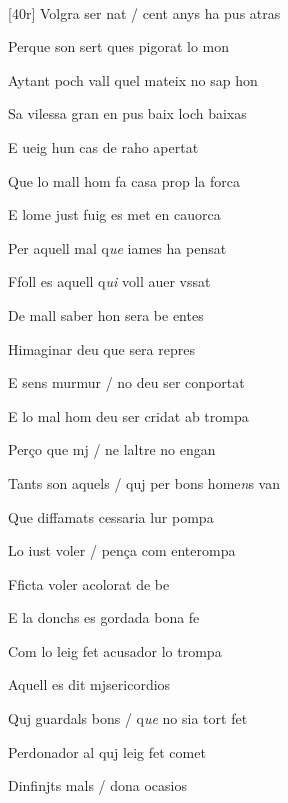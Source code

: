 \documentclass[12pt]{article}
\renewcommand{\espaiAbansEtiquetaPoema}{\vspace{0ex}}
\begin{document}
\begin{estrofa}

\espaiAbansEtiquetaPoema

\\

\end{estrofa}


\begin{estrofa}

 [40r] Volgra ser nat / cent anys ha pus atras

 Perque son sert ques pigorat lo mon

 Aytant poch vall quel mateix no sap hon

 Sa vilessa gran en pus baix loch baixas

 E ueig hun cas de raho apertat

 Que lo mall hom fa casa prop la forca

 E lome just fuig es met en cauorca

 Per aquell mal q\textit{ue} iames ha pensat

\end{estrofa}



\begin{estrofa}

 Ffoll es aquell q\textit{ui} voll auer vssat

 De mall saber hon sera be entes

 Himaginar deu que sera repres

 E sens murmur / no deu ser conportat

 E lo mal hom deu ser cridat ab trompa

 Per\c{c}o que mj / ne laltre no engan

 Tants son aquels / quj per bons home\textit{n}s van

 Que diffamats cessaria lur pompa

\end{estrofa}



\begin{estrofa}

 Lo iust voler / pen\c{c}a com enterompa

 Fficta voler acolorat de be

 E la donchs es gordada bona fe

 Com lo leig fet acusador lo trompa

 Aquell es dit mjsericordios

 Quj guardals bons / q\textit{ue} no sia tort fet

 Perdonador al quj leig fet comet

 Dinfinjts mals / dona ocasios

\end{estrofa}
\end{document}
